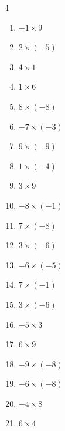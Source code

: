 \begin{multicols}{4}
\begin{enumerate}
  \item $-1\times 9$
        \phantom{$=-9$}

  \item $2\times (-5)$
        \phantom{$=-10$}

  \item $4\times 1$
        \phantom{$=4$}

  \item $1\times 6$
        \phantom{$=6$}

  \item $8\times (-8)$
        \phantom{$=-64$}

  \item $-7\times (-3)$
        \phantom{$=21$}

  \item $9\times (-9)$
        \phantom{$=-81$}

  \item $1\times (-4)$
        \phantom{$=-4$}

  \item $3\times 9$
        \phantom{$=27$}

  \item $-8\times (-1)$
        \phantom{$=8$}

  \item $7\times (-8)$
        \phantom{$=-56$}

  \item $3\times (-6)$
        \phantom{$=-18$}

  \item $-6\times (-5)$
        \phantom{$=30$}

  \item $7\times (-1)$
        \phantom{$=-7$}

  \item $3\times (-6)$
        \phantom{$=-18$}

  \item $-5\times 3$
        \phantom{$=-15$}

  \item $6\times 9$
        \phantom{$=54$}

  \item $-9\times (-8)$
        \phantom{$=72$}

  \item $-6\times (-8)$
        \phantom{$=48$}

  \item $-4\times 8$
        \phantom{$=-32$}

  \item $6\times 4$
        \phantom{$=24$}


\end{enumerate}
\end{multicols}

